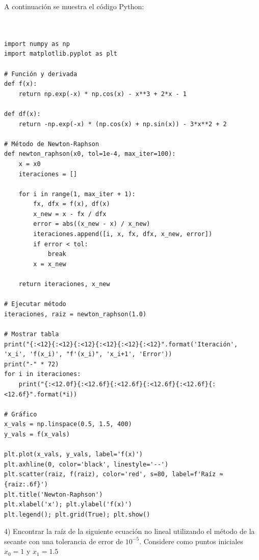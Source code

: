 \documentclass[12pt]{article}
\begin{document}
\begin{center}
A continuación se muestra el código Python:


\begin{tcolorbox}[title=Método de Newton-Raphson,
                  colback=white,
                  colframe=black,
                  breakable, enhanced]
\begin{lstlisting}[style=mypython]


import numpy as np
import matplotlib.pyplot as plt

# Función y derivada
def f(x):
    return np.exp(-x) * np.cos(x) - x**3 + 2*x - 1

def df(x):
    return -np.exp(-x) * (np.cos(x) + np.sin(x)) - 3*x**2 + 2

# Método de Newton-Raphson
def newton_raphson(x0, tol=1e-4, max_iter=100):
    x = x0
    iteraciones = []

    for i in range(1, max_iter + 1):
        fx, dfx = f(x), df(x)
        x_new = x - fx / dfx
        error = abs((x_new - x) / x_new)
        iteraciones.append([i, x, fx, dfx, x_new, error])
        if error < tol:
            break
        x = x_new

    return iteraciones, x_new

# Ejecutar método
iteraciones, raiz = newton_raphson(1.0)

# Mostrar tabla
print("{:<12}{:<12}{:<12}{:<12}{:<12}{:<12}".format('Iteración', 'x_i', 'f(x_i)', "f'(x_i)", 'x_i+1', 'Error'))
print("-" * 72)
for i in iteraciones:
    print("{:<12.0f}{:<12.6f}{:<12.6f}{:<12.6f}{:<12.6f}{:<12.6f}".format(*i))

# Gráfico
x_vals = np.linspace(0.5, 1.5, 400)
y_vals = f(x_vals)

plt.plot(x_vals, y_vals, label='f(x)')
plt.axhline(0, color='black', linestyle='--')
plt.scatter(raiz, f(raiz), color='red', s=80, label=f'Raíz ≈ {raiz:.6f}')
plt.title('Newton-Raphson')
plt.xlabel('x'); plt.ylabel('f(x)')
plt.legend(); plt.grid(True); plt.show()

\end{lstlisting}
\end{tcolorbox}



4) Encontrar la raíz de la siguiente ecuación no lineal utilizando el método de la secante con una tolerancia de error de $10^{-5}$. Considere como puntos iniciales $x_0=1$ y $x_1=1.5$

\begin{figure}[h]
	\centering
\end{figure}
\end{center}
\end{document}
